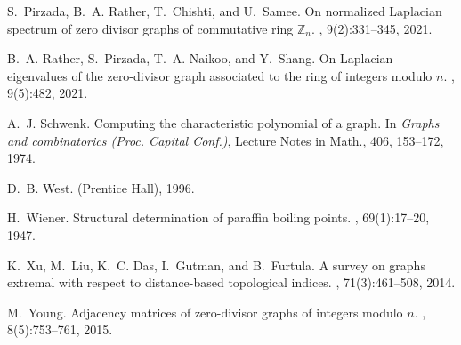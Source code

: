 \documentclass{amsart}
\theoremstyle{plain}
\theoremstyle{definition}
\theoremstyle{remark}
\begin{document}
\begin{thebibliography}{10}
S.~Pirzada, B.~A. Rather, T.~Chishti, and U.~Samee.
\newblock On normalized Laplacian spectrum of zero divisor graphs of
  commutative ring $\mathbb{Z}_n$.
,
  9(2):331--345, 2021.

B.~A. Rather, S.~Pirzada, T.~A. Naikoo, and Y.~Shang.
\newblock On Laplacian eigenvalues of the zero-divisor graph associated to the
  ring of integers modulo $n$.
, 9(5):482, 2021.

A.~J. Schwenk.
\newblock Computing the characteristic polynomial of a graph.
\newblock In {\em Graphs and combinatorics ({P}roc. {C}apital {C}onf.)}, Lecture
  Notes in Math., 406, 153--172, 1974.

D.~B. West.
\newblock (Prentice Hall), 1996.

H.~Wiener.
\newblock Structural determination of paraffin boiling points.
, 69(1):17--20, 1947.

K.~Xu, M.~Liu, K.~C. Das, I.~Gutman, and B.~Furtula.
\newblock A survey on graphs extremal with respect to distance-based
  topological indices.
, 71(3):461--508, 2014.

M.~Young.
\newblock Adjacency matrices of zero-divisor graphs of integers modulo $n$.
, 8(5):753--761, 2015.

\end{thebibliography}
\end{document}
